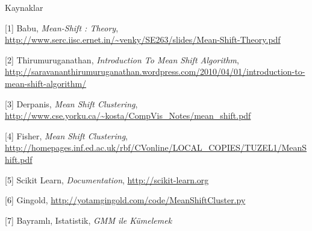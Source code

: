 \documentclass[12pt,fleqn]{article}\usepackage{../../common}
\begin{document}
Kaynaklar

[1] Babu, {\em Mean-Shift : Theory}, \url{http://www.serc.iisc.ernet.in/~venky/SE263/slides/Mean-Shift-Theory.pdf}

[2] Thirumuruganathan, {\em Introduction To Mean Shift Algorithm}, \url{http://saravananthirumuruganathan.wordpress.com/2010/04/01/introduction-to-mean-shift-algorithm/}

[3] Derpanis, {\em Mean Shift Clustering}, \url{http://www.cse.yorku.ca/~kosta/CompVis_Notes/mean_shift.pdf}

[4] Fisher, {\em Mean Shift Clustering}, \url{http://homepages.inf.ed.ac.uk/rbf/CVonline/LOCAL_COPIES/TUZEL1/MeanShift.pdf}

[5] Scikit Learn, {\em Documentation}, \url{http://scikit-learn.org}

[6] Gingold, \url{http://yotamgingold.com/code/MeanShiftCluster.py}

[7] Bayramlı, Istatistik, {\em GMM ile Kümelemek}
\end{document}
